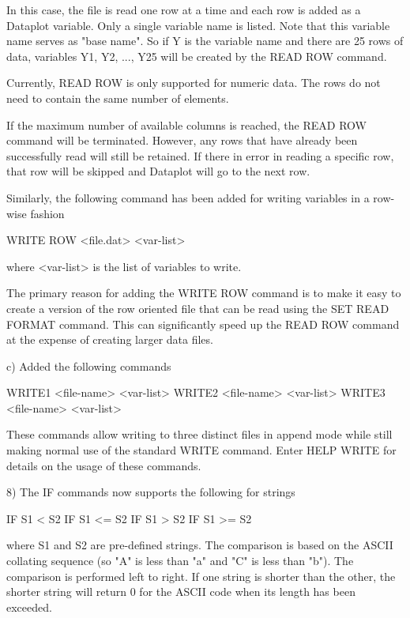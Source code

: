        In this case, the file is read one row at a time
       and each row is added as a Dataplot variable.  Only
       a single variable name is listed.  Note that this
       variable name serves as "base name".  So if Y is
       the variable name and there are 25 rows of data,
       variables Y1, Y2, ..., Y25 will be created by the
       READ ROW command.

       Currently, READ ROW is only supported for numeric
       data.  The rows do not need to contain the same
       number of elements.

       If the maximum number of available columns is reached,
       the READ ROW command will be terminated.  However,
       any rows that have already been successfully read
       will still be retained.  If there in error in reading
       a specific row, that row will be skipped and Dataplot
       will go to the next row.

       Similarly, the following command has been added for
       writing variables in a row-wise fashion

           WRITE ROW <file.dat>  <var-list>

       where <var-list> is the list of variables to write.

       The primary reason for adding the WRITE ROW command
       is to make it easy to create a version of the
       row oriented file that can be read using the
       SET READ FORMAT command.  This can significantly
       speed up the READ ROW command at the expense of
       creating larger data files.

    c) Added the following commands

          WRITE1 <file-name> <var-list>
          WRITE2 <file-name> <var-list>
          WRITE3 <file-name> <var-list>

       These commands allow writing to three distinct files in
       append mode while still making normal use of the standard
       WRITE command.  Enter HELP WRITE for details on the usage
       of these commands.

 8) The IF commands now supports the following for strings

        IF S1 <  S2
        IF S1 <= S2
        IF S1 >  S2
        IF S1 >= S2

     where S1 and S2 are pre-defined strings.  The comparison is based
     on the ASCII collating sequence (so "A" is less than "a" and "C" is
     less than  "b").  The comparison is performed left to right.  If
     one string is shorter than the other, the shorter string will
     return 0 for the ASCII code when its length has been exceeded.

